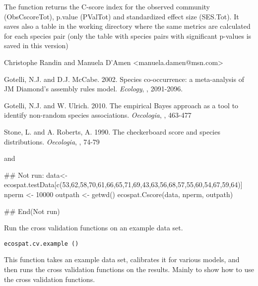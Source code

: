 \documentclass[a4paper]{book}
\begin{document}
%
\begin{Value}
The function returns the C-score index for the observed community (ObsCscoreTot), p.value (PValTot) and standardized effect size (SES.Tot). It saves also a table in the working directory where the same metrics are calculated for each species pair (only the table with species pairs with significant p-values is saved in this version)
\end{Value}
%
\begin{Author}\relax
Christophe Randin  and Manuela D'Amen <manuela.damen@msn.com>
\end{Author}
%
\begin{References}\relax
Gotelli, N.J. and D.J. McCabe. 2002. Species co-occurrence: a meta-analysis of JM Diamond's
assembly rules model. \emph{Ecology}, , 2091-2096.

Gotelli, N.J. and W. Ulrich. 2010. The empirical Bayes approach as a tool to identify non-random species associations. \emph{Oecologia}, , 463-477

Stone, L. and A. Roberts, A. 1990. The checkerboard score and species distributions. \emph{Oecologia}, , 74-79

\end{References}
%
\begin{SeeAlso}\relax
{} and 
\end{SeeAlso}
%
\begin{Examples}
\begin{ExampleCode}
## Not run: 
data<- ecospat.testData[c(53,62,58,70,61,66,65,71,69,43,63,56,68,57,55,60,54,67,59,64)]
nperm <- 10000
outpath <- getwd()
ecospat.Cscore(data, nperm, outpath)


## End(Not run)
\end{ExampleCode}
\end{Examples}
%
\begin{Description}\relax
Run the cross validation functions on an example data set.
\end{Description}
%
\begin{Usage}
\begin{verbatim}
ecospat.cv.example ()
\end{verbatim}
\end{Usage}
%
\begin{Details}\relax
This function takes an example data set, calibrates it for various models, and then runs the cross validation functions on the results. Mainly to show how to use the cross validation functions.
\end{Details}
\end{document}
